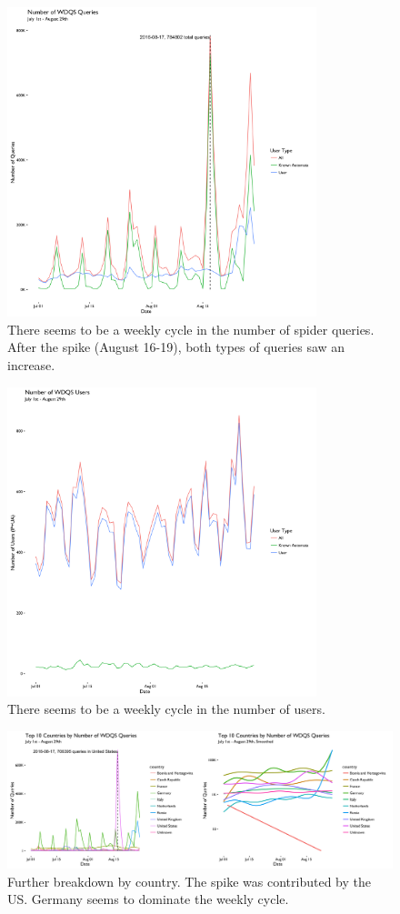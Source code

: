 \documentclass[12pt,]{article}
\begin{document}
\begin{figure}[H]
\centering
\includegraphics[width=9cm,height=9cm,keepaspectratio]{figures/all_query_ts.png}
\caption{There seems to be a weekly cycle in the number of spider
queries. After the spike (August 16-19), both types of queries saw an
increase.}
\end{figure}

\begin{figure}[H]
\centering
\includegraphics[width=9cm,height=9cm,keepaspectratio]{figures/all_user_ts.png}
\caption{There seems to be a weekly cycle in the number of users.}
\end{figure}

\begin{figure}[H]
\centering
\includegraphics{figures/query_country_ts.png}
\caption{Further breakdown by country. The spike was contributed by the
US. Germany seems to dominate the weekly cycle.}
\end{figure}
\end{document}
